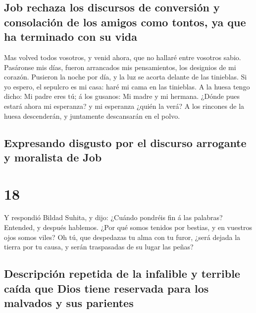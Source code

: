 \hypertarget{job-rechaza-los-discursos-de-conversiuxf3n-y-consolaciuxf3n-de-los-amigos-como-tontos-ya-que-ha-terminado-con-su-vida}{%
\subsection{Job rechaza los discursos de conversión y consolación de los
amigos como tontos, ya que ha terminado con su
vida}\label{job-rechaza-los-discursos-de-conversiuxf3n-y-consolaciuxf3n-de-los-amigos-como-tontos-ya-que-ha-terminado-con-su-vida}}

 Mas volved todos vosotros, y venid ahora, que no hallaré
entre vosotros sabio.  Pasáronse mis días, fueron
arrancados mis pensamientos, los designios de mi corazón.
 Pusieron la noche por día, y la luz se acorta delante de
las tinieblas.  Si yo espero, el sepulcro es mi casa:
haré mi cama en las tinieblas.  A la huesa tengo dicho:
Mi padre eres tú; á los gusanos: Mi madre y mi hermana. 
¿Dónde pues estará ahora mi esperanza? y mi esperanza ¿quién la verá?
 A los rincones de la huesa descenderán, y juntamente
descansarán en el polvo.

\hypertarget{expresando-disgusto-por-el-discurso-arrogante-y-moralista-de-job}{%
\subsection{Expresando disgusto por el discurso arrogante y moralista de
Job}\label{expresando-disgusto-por-el-discurso-arrogante-y-moralista-de-job}}

\hypertarget{section-18-18}{%
\section{18}\label{section-18-18}}

 Y respondió Bildad Suhita, y dijo:  ¿Cuándo
pondréis fin á las palabras? Entended, y después hablemos.
 ¿Por qué somos tenidos por bestias, y en vuestros ojos
somos viles?  Oh tú, que despedazas tu alma con tu furor,
¿será dejada la tierra por tu causa, y serán traspasadas de su lugar las
peñas?

\hypertarget{descripciuxf3n-repetida-de-la-infalible-y-terrible-cauxedda-que-dios-tiene-reservada-para-los-malvados-y-sus-parientes}{%
\subsection{Descripción repetida de la infalible y terrible caída que
Dios tiene reservada para los malvados y sus
parientes}\label{descripciuxf3n-repetida-de-la-infalible-y-terrible-cauxedda-que-dios-tiene-reservada-para-los-malvados-y-sus-parientes}}

